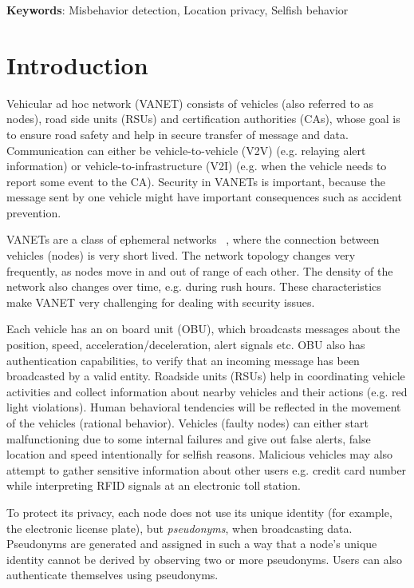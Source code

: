 \documentclass[conference]{IEEEtran}[10pt]
\begin{document}
\textbf{Keywords}: Misbehavior detection, Location privacy, Selfish behavior


\section{Introduction}
Vehicular ad hoc network (VANET) consists of vehicles (also referred to as nodes), 
road side units (RSUs) and certification authorities (CAs), whose
goal is to ensure road safety and help in secure transfer of message and data. 
Communication can either be vehicle-to-vehicle (V2V) (e.g. relaying alert information)
or vehicle-to-infrastructure (V2I) (e.g. when the vehicle
needs to report some event to the CA). 
Security in VANETs is important, because the message sent by one vehicle might have important consequences such as accident prevention. 

VANETs are a class of ephemeral networks ~\cite{R09}, where the connection between vehicles (nodes) is very short lived. 
The network topology changes very frequently, as nodes move in and out of range of each other. 
The density of the network also changes over time, e.g. during rush hours. 
These characteristics make VANET very challenging for dealing with security issues. 

Each vehicle has an on board unit (OBU), which broadcasts messages about the position, speed, acceleration/deceleration, 
alert signals etc. OBU also has authentication capabilities, to
verify that an incoming message has been broadcasted by a valid entity. 
Roadside units (RSUs) help in coordinating vehicle activities and 
collect information about nearby vehicles and their actions (e.g. red light violations). Human behavioral tendencies will be reflected in the movement of the vehicles (rational behavior).
Vehicles (faulty nodes) can either start malfunctioning due to some internal failures and give out false alerts,
false location and speed intentionally for selfish reasons. 
Malicious vehicles may also attempt to gather sensitive information about other users e.g. credit card number while
interpreting RFID signals 
at an electronic toll station. 

To protect its privacy, each node does not use its unique identity (for example, the electronic license plate), 
but \emph{pseudonyms}, when broadcasting data. 
Pseudonyms are generated and assigned in such a way that a node's unique identity cannot be derived by observing two or more pseudonyms. 
Users can also authenticate themselves using pseudonyms. 
\end{document}
